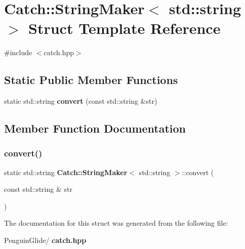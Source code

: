 \section{Catch\+::String\+Maker$<$ std\+::string $>$ Struct Template Reference}
\label{struct_catch_1_1_string_maker_3_01std_1_1string_01_4}


{\ttfamily \#include $<$catch.\+hpp$>$}

\subsection*{Static Public Member Functions}
\begin{DoxyCompactItemize}
\item 
static std\+::string \textbf{ convert} (const std\+::string \&str)
\end{DoxyCompactItemize}


\subsection{Member Function Documentation}
\mbox{\label{struct_catch_1_1_string_maker_3_01std_1_1string_01_4_ae065b2ecc5c1a6c4409cf06d604bd66d}} 
\subsubsection{convert()}
{\footnotesize\ttfamily static std\+::string \textbf{ Catch\+::\+String\+Maker}$<$ std\+::string $>$\+::convert (\begin{DoxyParamCaption}\item[{const std\+::string \&}]{str }\end{DoxyParamCaption})\hspace{0.3cm}{\ttfamily [static]}}



The documentation for this struct was generated from the following file\+:\begin{DoxyCompactItemize}
\item 
Penguin\+Glide/\textbf{ catch.\+hpp}\end{DoxyCompactItemize}
